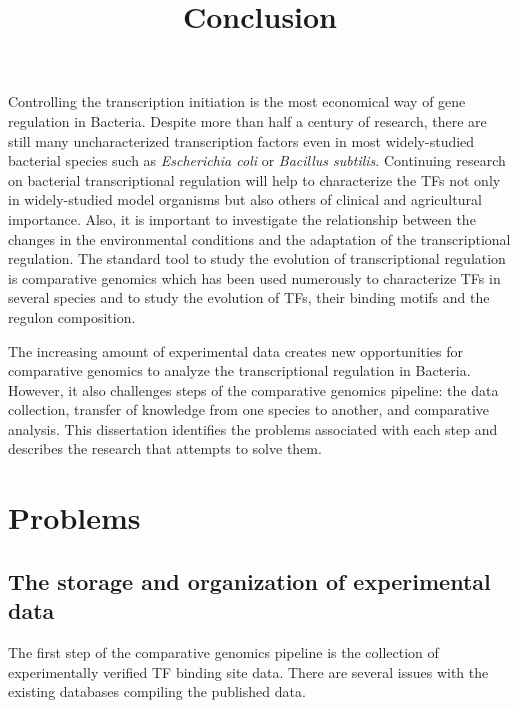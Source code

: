 \documentclass[12pt]{article}
\title{Conclusion}
\date{}
\begin{document}
\linenumbers
\doublespacing

\maketitle

Controlling the transcription initiation is the most economical way of gene
regulation in Bacteria. Despite more than half a century of research, there are
still many uncharacterized transcription factors even in most widely-studied
bacterial species such as \textit{Escherichia coli} or \textit{Bacillus
  subtilis}. Continuing research on bacterial transcriptional regulation will
help to characterize the TFs not only in widely-studied model organisms but
also others of clinical and agricultural importance. Also, it is important to
investigate the relationship between the changes in the environmental
conditions and the adaptation of the transcriptional regulation. The standard
tool to study the evolution of transcriptional regulation is comparative
genomics which has been used numerously to characterize TFs in several species
and to study the evolution of TFs, their binding motifs and the regulon
composition.

The increasing amount of experimental data creates new opportunities for
comparative genomics to analyze the transcriptional regulation in
Bacteria. However, it also challenges steps of the comparative genomics
pipeline: the data collection, transfer of knowledge from one species to
another, and comparative analysis. This dissertation identifies the problems
associated with each step and describes the research that attempts to solve
them.

\section{Problems}

\subsection{The storage and organization of experimental data}

The first step of the comparative genomics pipeline is the collection of
experimentally verified TF binding site data. There are several issues with the
existing databases compiling the published data.
\end{document}
